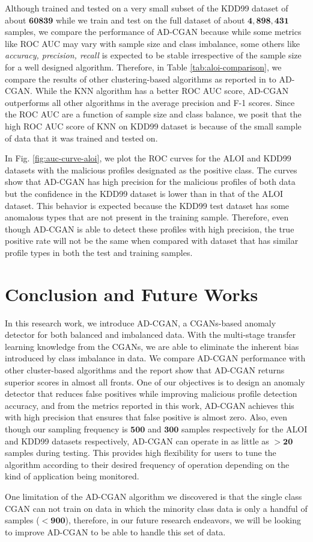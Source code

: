  Although \cite{campos2016evaluation} trained and tested on a very small subset of the KDD99 dataset of about $ \bm{60839}  $ while we train and test on the full dataset of about $ \bm{4,898,431} $ samples, we compare the performance of AD-CGAN because while some metrics like ROC AUC may vary with sample size and class imbalance, some others like \textit{accuracy, precision, recall} is expected to be stable irrespective of the sample size for a well designed algorithm. Therefore, in Table \ref{tab:aloi-comparison}, we compare the results of other clustering-based algorithms as reported in \cite{campos2016evaluation} to AD-CGAN. While the KNN algorithm has a better ROC AUC score, AD-CGAN outperforms all other algorithms in the average precision and F-1 scores. Since the ROC AUC are a function of sample size and class balance, we posit that the high ROC AUC score of KNN on KDD99 dataset is because of the small sample of data that it was trained and tested on. \par 
In Fig. \ref{fig:auc-curve-aloi}, we plot the ROC curves for the ALOI and KDD99 datasets with the malicious profiles designated as the positive class. The curves show that AD-CGAN has high precision for the malicious profiles of both data but the confidence in the KDD99 dataset is lower than in that of the ALOI dataset. This behavior is expected because the KDD99 test dataset has some anomalous types that are not present in the training sample. Therefore, even though AD-CGAN is able to detect these profiles with high precision, the true positive rate will not be the same when compared with dataset that has similar profile types in both the test and training samples. 

\section{Conclusion and Future Works}
In this research work, we introduce AD-CGAN, a CGANs-based anomaly detector for both balanced and imbalanced data. With the multi-stage transfer learning knowledge from the CGANs, we are able to eliminate the inherent bias introduced by class imbalance in data. We compare AD-CGAN performance with other cluster-based algorithms and the report show that AD-CGAN returns superior scores in almost all fronts. One of our objectives is to design an anomaly detector that reduces false positives while improving malicious profile detection accuracy, and from the metrics reported in this work, AD-CGAN achieves this with high precision that ensures that false positive is almost zero. Also, even though our sampling frequency is $ \bm{500} $ and $ \bm{300} $ samples respectively for the ALOI and KDD99 datasets respectively, AD-CGAN can operate in as little as $ \bm{> 20} $ samples during testing. This provides high flexibility for users to tune the algorithm according to their desired frequency of operation depending on the kind of application being monitored.\par 
One limitation of the AD-CGAN algorithm we discovered is that the single class CGAN can not train on data in which the minority class data is only a handful of samples ($ \bm{<900} $), therefore, in our future research endeavors, we will be looking to improve AD-CGAN to be able to handle this set of data. 
\label{sec:conclusion}
